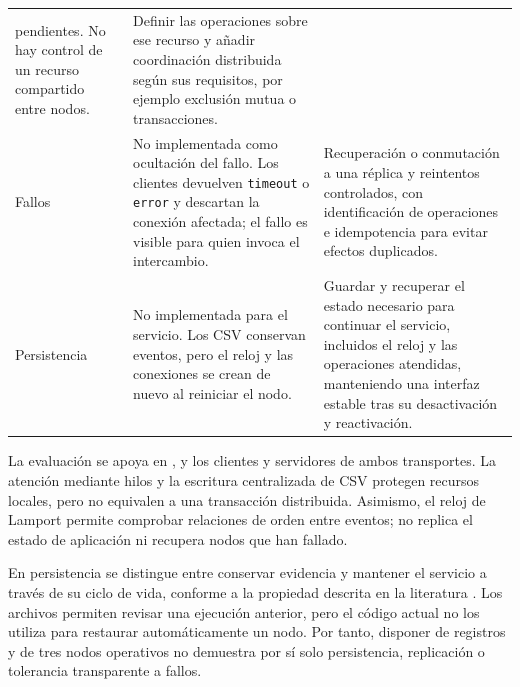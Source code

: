 \begin{longtable}{@{}>{\raggedright\arraybackslash}p{2.5cm}>{\raggedright\arraybackslash}p{5.4cm}>{\raggedright\arraybackslash}p{7.1cm}@{}}
pendientes. No hay control de un recurso compartido entre nodos.
& Definir las operaciones sobre ese recurso y añadir coordinación distribuida
según sus requisitos, por ejemplo exclusión mutua o transacciones. \\
Fallos & No implementada como ocultación del fallo. Los clientes devuelven
\texttt{timeout} o \texttt{error} y descartan la conexión afectada; el fallo es
visible para quien invoca el intercambio.
& Recuperación o conmutación a una réplica y reintentos controlados, con
identificación de operaciones e idempotencia para evitar efectos duplicados. \\
Persistencia & No implementada para el servicio. Los CSV conservan eventos,
pero el reloj y las conexiones se crean de nuevo al reiniciar el nodo.
& Guardar y recuperar el estado necesario para continuar el servicio, incluidos
el reloj y las operaciones atendidas, manteniendo una interfaz estable tras
su desactivación y reactivación. \\
\bottomrule
\end{longtable}
\endgroup

La evaluación se apoya en ,
 y los clientes y servidores de ambos transportes.
La atención mediante hilos y la escritura centralizada de CSV protegen recursos
locales, pero no equivalen a una transacción distribuida. Asimismo, el reloj de
Lamport permite comprobar relaciones de orden entre eventos; no replica el
estado de aplicación ni recupera nodos que han fallado.

En persistencia se distingue entre conservar evidencia y mantener el servicio
a través de su ciclo de vida, conforme a la propiedad descrita en la literatura
\cite[tabla~4]{belinda_soiland2024_transparency}. Los archivos permiten revisar
una ejecución anterior, pero el código actual no los utiliza para restaurar
automáticamente un nodo. Por tanto, disponer de registros y de tres nodos
operativos no demuestra por sí solo persistencia, replicación o tolerancia
transparente a fallos.
